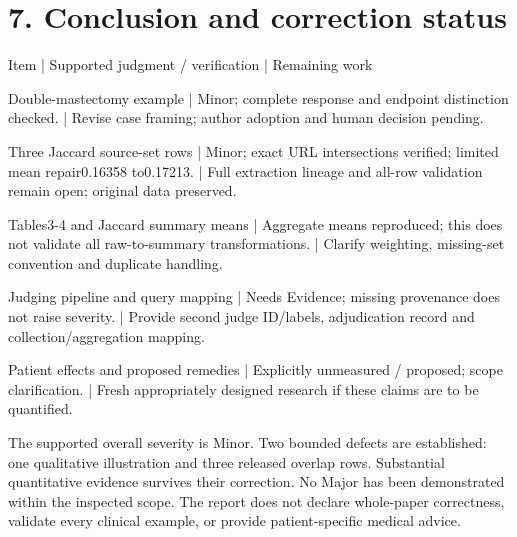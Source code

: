 \documentclass[10pt]{article}
\begin{document}
\section*{7. Conclusion and correction status}
Item | Supported judgment / verification | Remaining work\par
Double-mastectomy example | Minor; complete response and endpoint distinction checked. | Revise case framing; author adoption and human decision pending.\par
Three Jaccard source-set rows | Minor; exact URL intersections verified; limited mean repair0.16358 to0.17213. | Full extraction lineage and all-row validation remain open; original data preserved.\par
Tables3-4 and Jaccard summary means | Aggregate means reproduced; this does not validate all raw-to-summary transformations. | Clarify weighting, missing-set convention and duplicate handling.\par
Judging pipeline and query mapping | Needs Evidence; missing provenance does not raise severity. | Provide second judge ID/labels, adjudication record and collection/aggregation mapping.\par
Patient effects and proposed remedies | Explicitly unmeasured / proposed; scope clarification. | Fresh appropriately designed research if these claims are to be quantified.\par
The supported overall severity is Minor. Two bounded defects are established: one qualitative illustration and three released overlap rows. Substantial quantitative evidence survives their correction. No Major has been demonstrated within the inspected scope. The report does not declare whole-paper correctness, validate every clinical example, or provide patient-specific medical advice.\par
\end{document}
